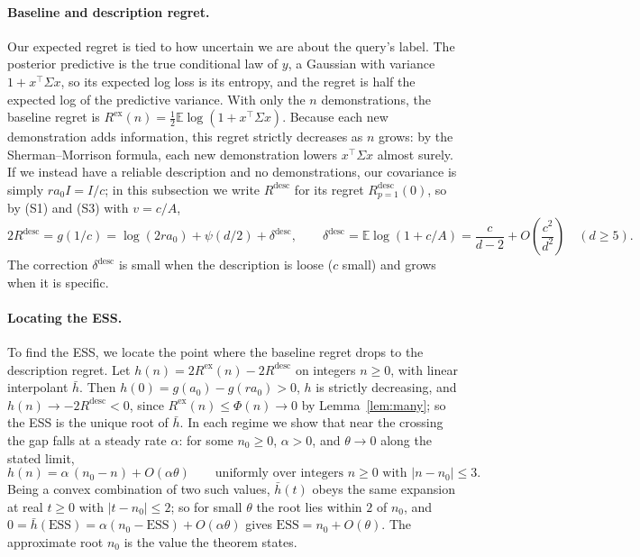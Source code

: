 \documentclass{article}
\newcommand{\ess}{\mathrm{ESS}}
\newcommand{\E}{\mathbb{E}}
\begin{document}
\paragraph{Baseline and description regret.}
Our expected regret is tied to how uncertain we are about the query's label. The posterior predictive is the true conditional law of $y$, a Gaussian with variance $1 + x^\top \Sigma x$, so its expected log loss is its entropy, and the regret is half the expected log of the predictive variance. With only the $n$ demonstrations, the baseline regret is $R^{\mathrm{ex}}(n) = \tfrac12 \E \log(1 + x^\top \Sigma x)$. Because each new demonstration adds information, this regret strictly decreases as $n$ grows: by the Sherman--Morrison formula, each new demonstration lowers $x^\top \Sigma x$ almost surely. If we instead have a reliable description and no demonstrations, our covariance is simply $r a_0 I = I/c$; in this subsection we write $R^{\mathrm{desc}}$ for its regret $R^{\mathrm{desc}}_{p=1}(0)$, so by (S1) and (S3) with $v = c/A$,
\begin{equation}\label{eq:rdesc}
2R^{\mathrm{desc}} = g(1/c) = \log(2 r a_0) + \psi(d/2) + \delta^{\mathrm{desc}},
\qquad
\delta^{\mathrm{desc}} = \E \log(1 + c/A) = \frac{c}{d-2} + O\!\left(\frac{c^2}{d^2}\right) \quad (d \ge 5).
\end{equation}
The correction $\delta^{\mathrm{desc}}$ is small when the description is loose ($c$ small) and grows when it is specific.

\paragraph{Locating the ESS.}
To find the ESS, we locate the point where the baseline regret drops to the description regret. Let $h(n) = 2R^{\mathrm{ex}}(n) - 2R^{\mathrm{desc}}$ on integers $n \ge 0$, with linear interpolant $\bar h$. Then $h(0) = g(a_0) - g(r a_0) > 0$, $h$ is strictly decreasing, and $h(n) \to -2R^{\mathrm{desc}} < 0$, since $R^{\mathrm{ex}}(n) \le \Phi(n) \to 0$ by Lemma~\ref{lem:many}; so the ESS is the unique root of $\bar h$. In each regime we show that near the crossing the gap falls at a steady rate $\alpha$: for some $n_0 \ge 0$, $\alpha > 0$, and $\theta \to 0$ along the stated limit,
\begin{equation}\label{eq:root}
h(n) = \alpha\,(n_0 - n) + O(\alpha\theta)
\qquad \text{uniformly over integers $n \ge 0$ with $|n - n_0| \le 3$.}
\end{equation}
Being a convex combination of two such values, $\bar h(t)$ obeys the same expansion at real $t \ge 0$ with $|t - n_0| \le 2$; so for small $\theta$ the root lies within $2$ of $n_0$, and $0 = \bar h(\ess) = \alpha(n_0 - \ess) + O(\alpha\theta)$ gives $\ess = n_0 + O(\theta)$. The approximate root $n_0$ is the value the theorem states.
\end{document}
